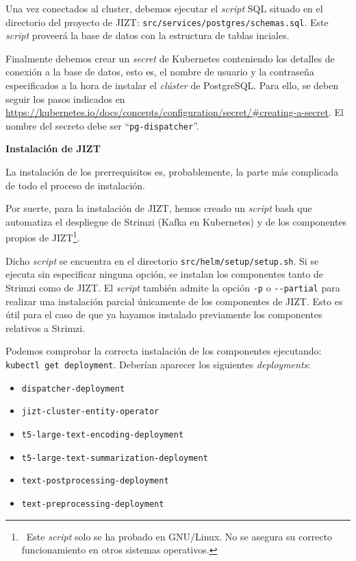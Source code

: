 Una vez conectados al cluster, debemos ejecutar el \emph{script} SQL situado en el directorio del proyecto de JIZT: \texttt{src/services/postgres/schemas.sql}. Este \emph{script} proveerá la base de datos con la estructura de tablas inciales.

Finalmente debemos crear un \emph{secret} de Kubernetes conteniendo los detalles de conexión a la base de datos, esto es, el nombre de usuario y la contraseña especificados a la hora de instalar el \emph{clúster} de PostgreSQL. Para ello, se deben seguir los pasos indicados en \href{https://kubernetes.io/docs/concepts/configuration/secret/#creating-a-secret}{https://kubernetes.io/docs/\newline concepts/configuration/secret/\#creating-a-secret}.  El nombre del secreto debe ser ``\texttt{pg-dispatcher}''.

\vspace{0.5cm}
\noindent
\textbf{Instalación de JIZT}

La instalación de los prerrequisitos es, probablemente, la parte más complicada de todo el proceso de instalación.

Por suerte, para la instalación de JIZT, hemos creado un \emph{script} bash que automatiza el despliegue de Strimzi (Kafka en Kubernetes) y de los componentes propios de JIZT\footnote{\, Este \emph{script} solo se ha probado en GNU/Linux. No se asegura su correcto funcionamiento en otros sistemas operativos.}.

Dicho \emph{script} se encuentra en el directorio \texttt{src/helm/setup/setup.sh}. Si se ejecuta sin especificar ninguna opción, se instalan los componentes tanto de Strimzi como de JIZT. El \emph{script} también admite la opción \texttt{-p} o \texttt{-{}-partial} para realizar una instalación parcial únicamente de los componentes de JIZT. Esto es útil para el caso de que ya hayamos instalado previamente los componentes relativos a Strimzi.

Podemos comprobar la correcta instalación de los componentes ejecutando: \texttt{kubectl get deployment}. Deberían aparecer los siguientes \emph{deployments}:

\vspace{-0.3cm}
\begin{itemize} [\textbullet]
	\tightlist
	\item \texttt{dispatcher-deployment}
	\item \texttt{jizt-cluster-entity-operator}
	\item \texttt{t5-large-text-encoding-deployment}
	\item \texttt{t5-large-text-summarization-deployment}
	\item \texttt{text-postprocessing-deployment}
	\item \texttt{text-preprocessing-deployment}
\end{itemize}

